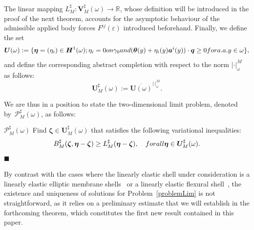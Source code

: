 \documentclass{amsart}
\newcommand*{\bqed}{\hfill\ensuremath{\blacksquare}}%
\begin{document}
The linear mapping $L_M^\sharp:\bm{V}_M^\sharp(\omega) \to \mathbb{R}$, whose definition will be introduced in the proof of the next theorem, accounts for the asymptotic behaviour of the admissible applied body forces $F^{ij}(\varepsilon)$ introduced beforehand.
Finally, we define the set
\begin{equation*}
\bm{U}(\omega):=\{\bm{\eta}=(\eta_i) \in \bm{H}^1(\omega); \eta_i=0 \textup{ on }\gamma_0 \textup{ and } (\bm{\theta}(y)+\eta_i(y)\bm{a}^i(y))\cdot\bm{q} \ge 0 \textup{ for a.a. }y\in \omega\},
\end{equation*}
and define the corresponding abstract completion with respect to the norm $|\cdot|_\omega^M$ as follows:
\begin{equation*}
	\bm{U}_M^\sharp(\omega):=\overline{\bm{U}(\omega)}^{|\cdot|_\omega^M}.
\end{equation*}

We are thus in a position to state the two-dimensional limit problem, denoted by~$\mathcal{P}_M^\sharp(\omega)$, as follows:

\begin{customprob}{$\mathcal{P}_M^\sharp(\omega)$}
\label{problemLim}
Find $\bm{\zeta} \in \bm{U}_M^\sharp(\omega)$ that satisfies the following variational inequalities:
\begin{equation*}
B_M^\sharp(\bm{\zeta},\bm{\eta}-\bm{\zeta}) \ge L_M^\sharp(\bm{\eta}-\bm{\zeta}),\quad\textup{ for all }\bm{\eta} \in \bm{U}_M^\sharp(\omega).
\end{equation*}
\bqed
\end{customprob}

By contrast with the cases where the linearly elastic shell under consideration is a linearly elastic elliptic membrane shells~\cite{CiaMarPie2018b,CiaMarPie2018} or a linearly elastic flexural shell~\cite{Pie2023}, the existence and uniqueness of solutions for Problem~\ref{problemLim} is not straightforward, as it relies on a preliminary estimate that we will establish in the forthcoming theorem, which constitutes the first new result contained in this paper.
\end{document}
